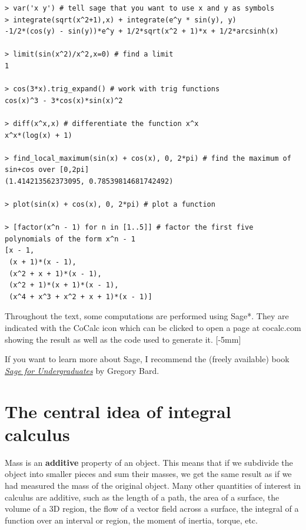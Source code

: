 \documentclass[svgnames]{watsonbook}
\begin{document}
\begin{lstlisting}
> var('x y') # tell sage that you want to use x and y as symbols
> integrate(sqrt(x^2+1),x) + integrate(e^y * sin(y), y)
-1/2*(cos(y) - sin(y))*e^y + 1/2*sqrt(x^2 + 1)*x + 1/2*arcsinh(x)

> limit(sin(x^2)/x^2,x=0) # find a limit
1

> cos(3*x).trig_expand() # work with trig functions
cos(x)^3 - 3*cos(x)*sin(x)^2

> diff(x^x,x) # differentiate the function x^x
x^x*(log(x) + 1)

> find_local_maximum(sin(x) + cos(x), 0, 2*pi) # find the maximum of sin+cos over [0,2pi]
(1.414213562373095, 0.78539814681742492)

> plot(sin(x) + cos(x), 0, 2*pi) # plot a function

> [factor(x^n - 1) for n in [1..5]] # factor the first five polynomials of the form x^n - 1
[x - 1,
 (x + 1)*(x - 1),
 (x^2 + x + 1)*(x - 1),
 (x^2 + 1)*(x + 1)*(x - 1),
 (x^4 + x^3 + x^2 + x + 1)*(x - 1)]
\end{lstlisting}

Throughout the text, some computations are performed using Sage*. They
are indicated with the CoCalc icon
\href{http://cocalc.com}{\cocalc} which can be clicked to
open a page at cocalc.com showing the result as well as the
code used to generate it. [-5mm]

If you want to learn more about Sage, I recommend the (freely
available) book
\href{http://www.gregorybard.com/Sage.html}{\textit{Sage for
    Undergraduates}} by Gregory Bard.

\newpage

\section{The central idea of integral calculus} \label{sec:centralidea}

Mass is an \textbf{additive} property of an object. This means that if
we subdivide the object into smaller pieces and sum their masses, we
get the same result as if we had measured the mass of the original
object. Many other quantities of interest in calculus are additive,
such as the length of a path, the area of a surface, the volume of a
3D region, the flow of a vector field across a surface, the integral
of a function over an interval or region, the moment of inertia,
torque, etc.
\end{document}
